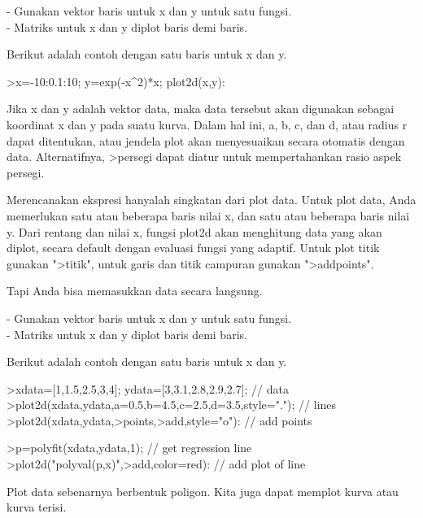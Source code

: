 \documentclass[a4paper,10pt]{article}
\begin{document}
\begin{eulernotebook}
\begin{eulercomment}
\begin{eulercomment}
\begin{eulercomment}
\begin{eulercomment}
\begin{eulercomment}
- Gunakan vektor baris untuk x dan y untuk satu fungsi.\\
- Matriks untuk x dan y diplot baris demi baris.

Berikut adalah contoh dengan satu baris untuk x dan y.
\end{eulercomment}
\begin{eulerprompt}
>x=-10:0.1:10; y=exp(-x^2)*x; plot2d(x,y):
\end{eulerprompt}
\begin{eulercomment}
Jika x dan y adalah vektor data, maka data tersebut akan digunakan
sebagai koordinat x dan y pada suatu kurva. Dalam hal ini, a, b, c,
dan d, atau radius r dapat ditentukan, atau jendela plot akan
menyesuaikan secara otomatis dengan data. Alternatifnya, \textgreater{}persegi
dapat diatur untuk mempertahankan rasio aspek persegi.

Merencanakan ekspresi hanyalah singkatan dari plot data. Untuk plot
data, Anda memerlukan satu atau beberapa baris nilai x, dan satu atau
beberapa baris nilai y. Dari rentang dan nilai x, fungsi plot2d akan
menghitung data yang akan diplot, secara default dengan evaluasi
fungsi yang adaptif. Untuk plot titik gunakan "\textgreater{}titik", untuk garis
dan titik campuran gunakan "\textgreater{}addpoints".

Tapi Anda bisa memasukkan data secara langsung.

- Gunakan vektor baris untuk x dan y untuk satu fungsi.\\
- Matriks untuk x dan y diplot baris demi baris.

Berikut adalah contoh dengan satu baris untuk x dan y.
\end{eulercomment}
\begin{eulerprompt}
>xdata=[1,1.5,2.5,3,4]; ydata=[3,3.1,2.8,2.9,2.7]; // data
>plot2d(xdata,ydata,a=0.5,b=4.5,c=2.5,d=3.5,style="."); // lines
>plot2d(xdata,ydata,>points,>add,style="o"): // add points
\end{eulerprompt}
\begin{eulerprompt}
>p=polyfit(xdata,ydata,1); // get regression line
>plot2d("polyval(p,x)",>add,color=red): // add plot of line
\end{eulerprompt}
\begin{eulercomment}
Plot data sebenarnya berbentuk poligon. Kita juga dapat memplot kurva
atau kurva terisi.


\end{eulercomment}
\end{eulercomment}
\end{eulercomment}
\end{eulercomment}
\end{eulercomment}
\end{eulernotebook}
\end{document}
